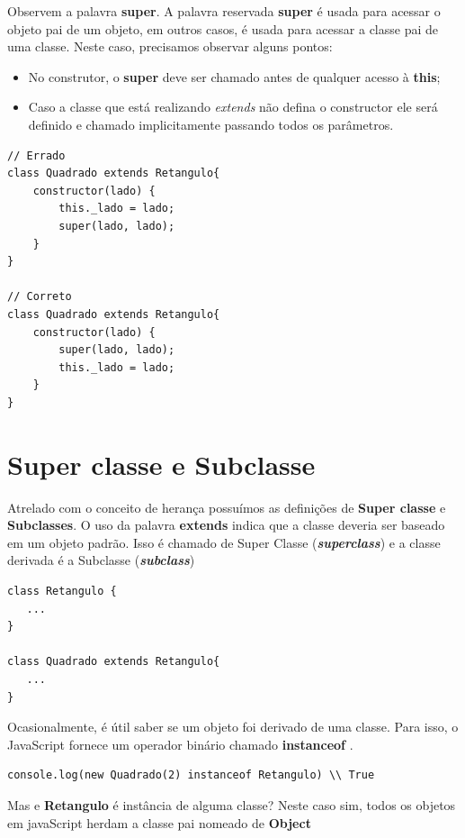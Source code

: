 Observem a palavra \textbf{super}. A palavra reservada \textbf{super} é usada para acessar o objeto pai de um objeto, em outros casos, é usada para acessar a classe pai de uma classe. Neste caso, precisamos observar alguns pontos: 

\begin{itemize}
	\item No construtor, o \textbf{super} deve ser chamado antes de qualquer acesso à \textbf{this};
	\item Caso a classe que está realizando \textit{extends} não defina o constructor ele será definido e chamado implicitamente passando todos os parâmetros.
\end{itemize}

\begin{lstlisting}
// Errado
class Quadrado extends Retangulo{
	constructor(lado) {
		this._lado = lado;
		super(lado, lado);
	}
}

// Correto
class Quadrado extends Retangulo{
	constructor(lado) {
		super(lado, lado);
		this._lado = lado;
	}
}
\end{lstlisting}

\section{Super classe e Subclasse}

Atrelado com o conceito de herança possuímos as definições de \textbf{Super classe} e \textbf{Subclasses}.  O uso da palavra \textbf{extends} indica que a classe deveria ser baseado em um objeto padrão. Isso é chamado de Super Classe (\textbf{\textit{superclass}}) e a classe derivada é a Subclasse (\textbf{\textit{subclass}}) \cite{haverbeke2018eloquent}

\begin{lstlisting}
class Retangulo {
   ...
}

class Quadrado extends Retangulo{
   ...
}
\end{lstlisting}

Ocasionalmente, é útil saber se um objeto foi derivado de uma
classe. Para isso, o JavaScript fornece um operador binário chamado \textbf{instanceof} \cite{haverbeke2018eloquent}. 

\begin{lstlisting}
console.log(new Quadrado(2) instanceof Retangulo) \\ True
\end{lstlisting}

Mas e \textbf{Retangulo} é instância de alguma classe? Neste caso sim, todos os objetos em javaScript herdam a classe pai nomeado de \textbf{Object}

